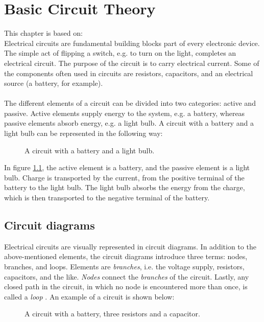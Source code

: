 \chapter{Basic Circuit Theory} \label{ch:basic}
This chapter is based on: \cite{bcircuit} \cite{bcircuit5}\\
Electrical circuits are fundamental building blocks part of every electronic device. The simple act of flipping a switch, e.g. to turn on the light, completes an electrical circuit. The purpose of the circuit is to carry electrical current. Some of the components often used in circuits are resistors, capacitors, and an electrical source (a battery, for example).
\\ 
\\
The different elements of a circuit can be divided into two categories: active and passive. Active elements supply energy to the system, e.g. a battery, whereas passive elements absorb energy, e.g. a light bulb. A circuit with a battery and a light bulb can be represented in the following way:
\begin{figure}[H]

\caption{A circuit with a battery and a light bulb.}
\label{fig:bulb}
\end{figure} 
\noindent In figure \ref{fig:bulb}, the active element is a battery, and the passive element is a light bulb. Charge is transported by the current, from the positive terminal of the battery to the light bulb. The light bulb absorbs the energy from the charge, which is then transported to the negative terminal of the battery.
\\



\section{Circuit diagrams}
Electrical circuits are visually represented in circuit diagrams. In addition to the above-mentioned elements, the circuit diagrams introduce three terms: nodes, branches, and loops. Elements are \textit{branches}, i.e.  the voltage supply, resistors, capacitors, and the like. \textit{Nodes} connect the \textit{branches} of the circuit. Lastly, any closed path in the circuit, in which no node is encountered more than once, is called a \textit{loop} \cite[p.~32]{bcircuit}. An example of a circuit is shown below:

\begin{figure}[H] 
 
 \caption{A circuit with a battery, three resistors and a capacitor.}
 \label{bcircuit_figure}
\end{figure}

